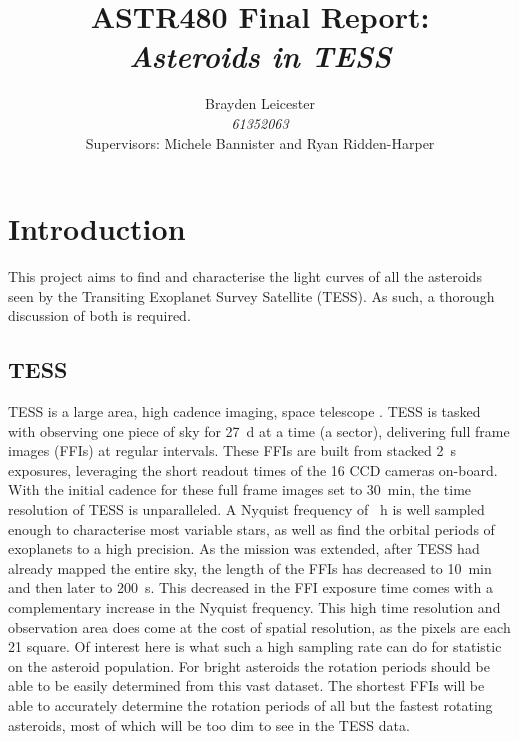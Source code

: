 \documentclass[12pt]{article}
\title{ASTR480 Final Report:\\
\textit{Asteroids in TESS}
}
\author{Brayden Leicester \\ 
\textit{61352063} \\
[1ex]\small{Supervisors: Michele Bannister and Ryan Ridden-Harper}
}
\begin{document}
\maketitle






\section{Introduction}\label{Sec:Intro}

This project aims to find and characterise the light curves of all the asteroids seen by the Transiting Exoplanet Survey Satellite (TESS).
As such, a thorough discussion of both is required.


\subsection{TESS}\label{SubSec:TESS}

TESS is a large area, high cadence imaging, space telescope  \citep{Ricker2014}.
TESS is tasked with observing one piece of sky for \qty{27}{\day} at a time (a sector), delivering  full frame images (FFIs) at regular intervals.
These FFIs are built from stacked \qty{2}{\second} exposures, leveraging the short readout times of the 16 CCD cameras on-board.
With the initial cadence for these full frame images set to \qty{30}{\minute}, the time resolution of TESS is unparalleled.
A Nyquist frequency %
of \unit{\per\hour} is well sampled enough to characterise most variable stars, as well as find the orbital periods of exoplanets to a high precision.
As the mission was extended, after TESS had already mapped the entire sky, the length of the FFIs has decreased to \qty{10}{\minute} and then later to \qty{200}{\second}.
This decreased in the FFI exposure time comes with a complementary increase in the Nyquist frequency.
This high time resolution and observation area does come at the cost of spatial resolution, as the pixels are each \qty{21}{\arcsec} square.
Of interest here is what such a high sampling rate can do for statistic on the asteroid population.
For bright asteroids the rotation periods should be able to be easily determined from this vast dataset.
The shortest FFIs will be able to accurately determine the rotation periods of all but the fastest rotating asteroids, most of which will be too dim to see in the TESS data.
\end{document}
